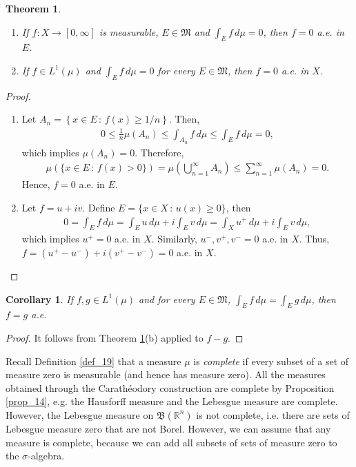 \documentclass[11pt]{book}
\newtheorem{theorem}{Theorem}[chapter]
\newtheorem{corollary}{Corollary}[theorem]
\theoremstyle{definition}
\numberwithin{equation}{chapter}
\begin{document}
\begin{theorem}\label{theorem_217}
~\begin{enumerate}[label=(\alph*)]
    \item If $f: X \to [0,\infty]$ is measurable, $E \in \mathfrak{M}$ and $\int_E f\,d\mu = 0$, then $f = 0$ a.e. in $E$.
    
    \item If $f \in L^1(\mu)$ and $\int_E f\,d\mu = 0$ for every $E \in \mathfrak{M}$, then $f = 0$ a.e. in $X$.
\end{enumerate}
\end{theorem}
\begin{proof}
~\begin{enumerate}[label=(\alph*)]
    \item Let $A_n = \left\{x \in E \,:\, f(x) \geq 1/n \right\}$. Then,
    \begin{align*}
        0 \leq \frac{1}{n} \mu(A_n) \leq \int_{A_n} f\,d\mu \leq \int_E f\,d\mu = 0,
    \end{align*}
    which implies $\mu(A_n) = 0$. Therefore,
    \begin{align*}
        \mu\left(\{x \in E \,:\, f(x) > 0 \}\right) = \mu\left(\bigcup^\infty_{n=1} A_n \right) \leq \sum^\infty_{n=1} \mu(A_n) = 0.
    \end{align*}
    Hence, $f = 0$ a.e. in $E$.
    
    \item Let $f = u + iv$. Define $E = \{x \in X \,:\, u(x) \geq 0 \}$, then 
    \begin{align*}
        0 = \int_E f\,d\mu = \int_E u\,d\mu + i \int_E v\,d\mu = \int_X u^+\,d\mu + i \int_E v\,d\mu,
    \end{align*}
    which implies $u^+ = 0$ a.e. in $X$. Similarly, $u^-, v^+, v^- = 0$ a.e. in $X$. Thus, $f = (u^+ - u^-) + i(v^+ - v^-) = 0$ a.e. in $X$.
\end{enumerate}
\end{proof}

\begin{corollary}
If $f,g \in L^1(\mu)$ and for every $E \in \mathfrak{M}$, $\int_E f\,d\mu = \int_E g\,d\mu$, then $f = g$ a.e.
\end{corollary}
\begin{proof}
It follows from Theorem \ref{theorem_217}(b) applied to $f - g$.
\end{proof}

\medskip


Recall Definition \ref{def_19} that a measure $\mu$ is {\em complete} if every subset of a set of measure zero is measurable (and hence has measure zero). All the measures obtained through the Carathéodory construction are complete by Proposition \ref{prop_14}, e.g. the Hausforff measure and the Lebesgue measure are complete. However, the Lebesgue measure on $\mathfrak{B}(\mathbb{R}^n)$ is not complete, i.e. there are sets of Lebesgue measure zero that are not Borel. However, we can assume that any measure is complete, because we can add all subsets of sets of measure zero to the $\sigma$-algebra.
\end{document}
